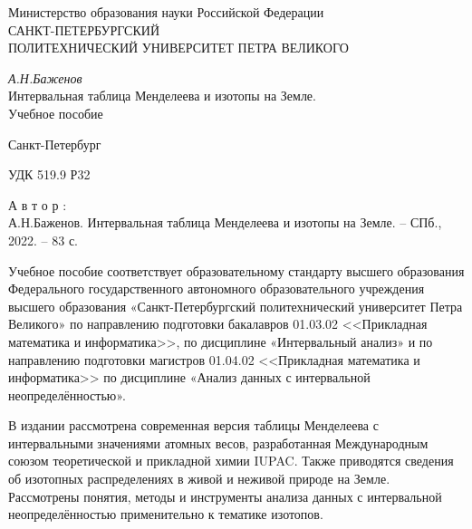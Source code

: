 \documentclass[a5paper,openany]{book}
\begin{document}
\begin{center}
	\hfill \break
	\Large{Министерство образования науки Российской Федерации}\\
	\hfill \break
	\Large{	САНКТ-ПЕТЕРБУРГСКИЙ \\
		ПОЛИТЕХНИЧЕСКИЙ УНИВЕРСИТЕТ ПЕТРА ВЕЛИКОГО}\\ 
	\hfill \break
	\hfill \break
	
	
	
	
	
	\Large{\it А.Н.Баженов\\
		\hfill \break		\hfill \break}
	{\huge 	Интервальная таблица Менделеева и изотопы на Земле.}\\
	\hfill \break \hfill \break
	\Large{	Учебное пособие	
	}\\
	\hfill \break \hfill \break
\end{center}

\hfill \break
\begin{center}\Large{Санкт-Петербург \\
		\hfill {}} \end{center}
\thispagestyle{empty} %



\newpage
УДК 519.9
Р32

А в т о р :\\
А.Н.Баженов.
Интервальная таблица Менделеева и изотопы на Земле. – СПб., 2022. – 83 с.
\hfill \break

Учебное пособие соответствует образовательному стандарту высшего
образования Федерального государственного автономного образовательного учреждения высшего образования «Санкт-Петербургский политехнический университет Петра Великого» по направлению подготовки бакалавров 01.03.02 <<Прикладная математика и информатика>>, по дисциплине «Интервальный анализ» и по направлению подготовки  магистров 01.04.02 <<Прикладная математика и информатика>> по дисциплине «Анализ данных с интервальной неопределённостью».


В издании рассмотрена современная версия таблицы Менделеева с интервальными значениями атомных весов, разработанная Международным союзом теоретической и прикладной химии IUPAC. 
Также приводятся сведения об изотопных распределениях в живой и неживой природе на Земле.
Рассмотрены понятия, методы и инструменты анализа данных с интервальной неопределённостью применительно к тематике изотопов.
\end{document}
